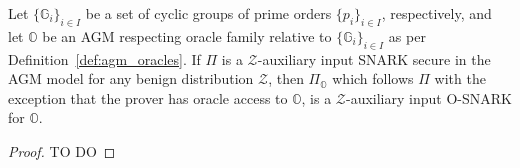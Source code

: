 \begin{comment}
\begin{theorem}[O-SNARKS for AGM Respecting Oracles]
\label{the:when_osnarks} 
Let $\mathbb{G}$ be a cyclic group of prime order $p$ and let $\mathbb{O}$ be an AGM respecting oracle 
relative to $\mathbb{G}$ as per Definition~\ref{def:agm_oracles}. We denote by $\mathcal{Z}_{\mathbb{O}}$ the 
probability distribution of all the public parameters that define a member of $\mathbb{O}$ together with some 
polynomial number $Q$ of queries and answers to $\mathbb{O}$. More formally: 
$\mathcal{Z}_{\mathbb{O}} = (\mathit{pp}, \{\mathcal{O}(q_i), q_i\}_{i=1}^Q)$, 
$Q = \mathsf{poly}(\lambda)$, $(\mathit{pp}, \mathcal{O}) \leftarrow \mathbb{O}$. Then every $\mathcal{Z}_{\mathbb{O}}$-auxiliary 
input SNARK $\Pi$ secure in the AGM model with respect to $\mathbb{G}$ is an O-SNARK for $\mathbb{O}$.
\end{theorem}
\end{comment}

\begin{theorem}
\label{the:when_osnarks} 
Let $\{\mathbb{G}_{i}\}_{i  \in I}$ be a set of cyclic groups of prime orders $\{p_i\}_{i \in I}$, respectively, and let $\mathbb{O}$ be an AGM 
respecting oracle family relative to $\{\mathbb{G}_{i}\}_{i  \in I}$ as per Definition~\ref{def:agm_oracles}.
 If $\Pi$ is a $\mathcal{Z}$-auxiliary input SNARK secure in the AGM model for any benign 
distribution $\mathcal{Z}$, then $\Pi_{\mathbb{O}}$ which follows $\Pi$ with the exception that the prover has oracle access to $\mathbb{O}$, 
is a $\mathcal{Z}$-auxiliary input O-SNARK for $\mathbb{O}$.
\end{theorem}

\begin{proof}TO DO
\begin{comment} Write a proof inspired by We denote by $\mathcal{Z}_{\mathbb{O}}$ the 
probability distribution of all the public parameters that define a member of $\mathbb{O}$ together with some 
polynomial number $Q$ of queries and answers to $\mathbb{O}$. More formally: 
$\mathcal{Z}_{\mathbb{O}} = (\mathit{pp}, \{\mathcal{O}(q_i), q_i\}_{i=1}^Q)$, 
$Q = \mathsf{poly}(\lambda)$, $(\mathit{pp}, \mathcal{O}) \leftarrow \mathbb{O}$. Then every $\mathcal{Z}_{\mathbb{O}}$-auxiliary 
input SNARK $\Pi$ secure in the AGM model with respect to $\mathbb{G}$ is an O-SNARK for $\mathbb{O}$.
\end{comment}
\end{proof}

